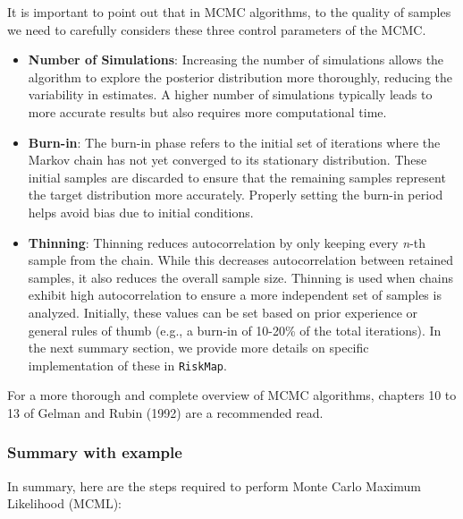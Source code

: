 \documentclass[
  letterpaper,
]{krantz}
\begin{document}
It is important to point out that in MCMC algorithms, to the quality of
samples we need to carefully considers these three control parameters of
the MCMC.

\begin{itemize}
\item
  \textbf{Number of Simulations}: Increasing the number of simulations
  allows the algorithm to explore the posterior distribution more
  thoroughly, reducing the variability in estimates. A higher number of
  simulations typically leads to more accurate results but also requires
  more computational time.
\item
  \textbf{Burn-in}: The burn-in phase refers to the initial set of
  iterations where the Markov chain has not yet converged to its
  stationary distribution. These initial samples are discarded to ensure
  that the remaining samples represent the target distribution more
  accurately. Properly setting the burn-in period helps avoid bias due
  to initial conditions.
\item
  \textbf{Thinning}: Thinning reduces autocorrelation by only keeping
  every \emph{n}-th sample from the chain. While this decreases
  autocorrelation between retained samples, it also reduces the overall
  sample size. Thinning is used when chains exhibit high autocorrelation
  to ensure a more independent set of samples is analyzed. Initially,
  these values can be set based on prior experience or general rules of
  thumb (e.g., a burn-in of 10-20\% of the total iterations). In the
  next summary section, we provide more details on specific
  implementation of these in \texttt{RiskMap}.
\end{itemize}

For a more thorough and complete overview of MCMC algorithms, chapters
10 to 13 of Gelman and Rubin (1992) are a recommended read.

\hypertarget{summary-with-example}{%
\subsubsection{Summary with example}\label{summary-with-example}}

In summary, here are the steps required to perform Monte Carlo Maximum
Likelihood (MCML):
\end{document}
